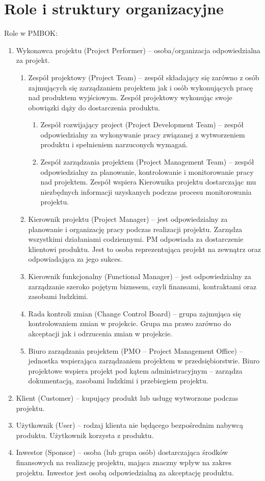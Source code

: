 
\section{Role i struktury organizacyjne}

Role w PMBOK:
\begin{enumerate}
\item	Wykonawca projektu (Project Performer) – osoba/organizacja odpowiedzialna za projekt.
	\begin{enumerate}
	\item	Zespół projektowy (Project Team) – zespół składający się zarówno z osób zajmujących się zarządzaniem projektem jak i  osób wykonujących pracę nad produktem wyjściowym.  Zespół projektowy wykonując swoje obowiązki dąży do dostarczenia produktu.
		\begin{enumerate}
		\item	Zespół rozwijający project (Project Development Team) – zespół odpowiedzialny za wykonywanie pracy związanej z wytworzeniem produktu i spełnieniem narzuconych wymagań.
		\item	Zespół zarządzania projektem (Project Management Team) – zespół odpowiedzialny za planowanie, kontrolowanie i monitorowanie pracy nad projektem. Zespół wspiera Kierownika projektu dostarczając mu niezbędnych informacji uzyskanych podczas procesu monitorowania projektu.
		\end{enumerate}
	\item	Kierownik projektu (Project Manager) – jest odpowiedzialny za planowanie i organizację pracy podczas realizacji projektu. Zarządza wszystkimi działaniami codziennymi. PM odpowiada za dostarczenie klientowi produktu. Jest to osoba reprezentująca projekt na zewnątrz oraz odpowiadająca za jego sukces.
	\item	Kierownik funkcjonalny (Functional Manager) – jest odpowiedzialny za zarządzanie szeroko pojętym biznesem, czyli finansami, kontraktami oraz zasobami ludzkimi.
	\item	Rada kontroli zmian (Change Control Board) – grupa zajmująca się kontrolowaniem zmian w projekcie. Grupa ma prawo zarówno do akceptacji jak i odrzucenia zmian w projekcie. 
	\item	Biuro zarządzania projektem (PMO – Project Management Office) – jednostka wspierająca zarządzaniem projektem w przedsiębiorstwie. Biuro projektowe wspiera projekt pod kątem administracyjnym – zarządza dokumentacją, zasobami ludzkimi i przebiegiem projektu.
	\end{enumerate}
\item	Klient (Customer) – kupujący produkt lub usługę wytworzone podczas projektu.  
\item	Użytkownik (User) – rodzaj klienta nie będącego bezpośrednim nabywcą produktu. Użytkownik korzysta  z produktu.
\item	Inwestor (Sponsor) – osoba (lub grupa osób) dostarczająca środków finansowych na realizację projektu, mająca znaczny wpływ na zakres projektu. Inwestor jest osobą odpowiedzialną za akceptację produktu.


\end{enumerate}

